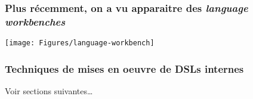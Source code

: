 \begin{frame}
\frametitle{Plus r\'ecemment, on a vu apparaitre des \emph{language workbenches}}

{\hspace*{-0.5cm}\texttt{[image: Figures/language-workbench]}}

\vfill


\end{frame}



\begin{frame}
\frametitle{Techniques de mises en oeuvre de DSLs internes}

\huge Voir sections suivantes\ldots


\NOTE{\ }

\end{frame}
